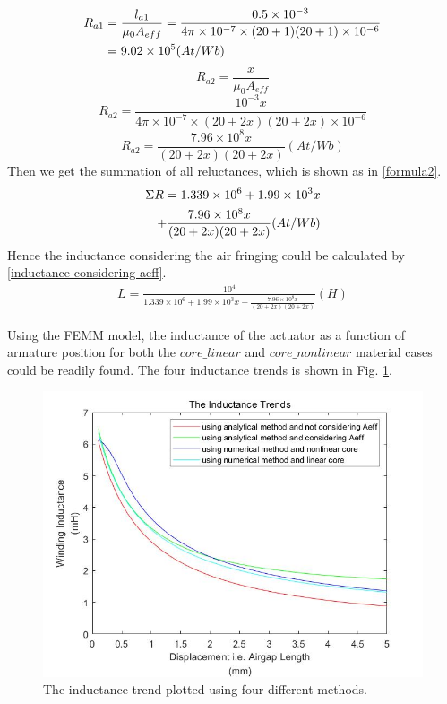 \documentclass[a4paper]{IEEEtran}
\begin{document}
\begin{align}
	R_{a1} &= \frac{l_{a1}}{\mu_0 A_{eff}} = \frac{0.5\times 10^{-3}}{4\pi\times10^{-7}\times (20+1)(20+1)\times 10^{-6}}\notag\\
  &= 9.02\times 10^5 (At/Wb) \label{formula1}
\end{align}
\begin{equation}
	R_{a2} = \frac{x}{\mu_0 A_{eff}}  
\end{equation}
\begin{equation}
	R_{a2} = \frac{10^{-3}x}{4\pi\times10^{-7}\times (20+2x)(20+2x)\times 10^{-6}}
\end{equation}
\begin{equation}
	R_{a2} = \frac{7.96\times 10^8 x}{(20+2x)(20+2x)} (At/Wb)
\end{equation}
Then we get the summation of all reluctances, which is shown as in \eqref{formula2}.
\begin{align}
	\Sigma R = 1.339\times 10^6 + 1.99\times 10^3x\notag\\ + \frac{7.96\times 10^8 x}{(20+2x)(20+2x)}  (At/Wb) \label{formula2}
\end{align}
Hence the inductance considering the air fringing could be calculated by \eqref{inductance considering aeff}.
\begin{align}
	L = \frac{10^4}{1.339\times 10^6 + 1.99\times 10^3x + \frac{7.96\times 10^8 x}{(20+2x)(20+2x)}} (H) \label{inductance considering aeff}
\end{align}

Using the FEMM model, the inductance of the actuator as a function of armature position for both the $ core\_{linear} $  and $ core\_{nonlinear} $ material cases could be readily found.
The four inductance trends is shown in Fig. \ref{induc1}.\par 

\begin{figure}[H]
\begin{centering}
\includegraphics[scale=0.4]{induc1.jpg}
\par\end{centering}   
\caption{The inductance trend plotted using four different methods.\label{induc1}}
\end{figure}   
\end{document}
